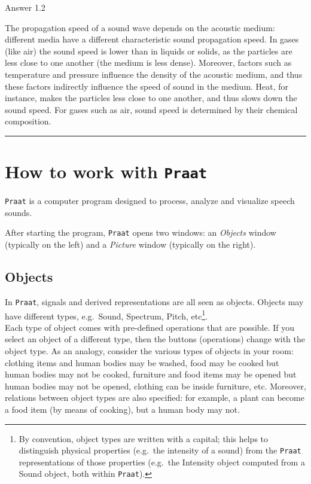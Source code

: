 \documentclass[
]{book}
\begin{document}
Answer 1.2

The propagation speed of a sound wave depends on the acoustic medium: different media have a different characteristic sound propagation speed. In gases (like air) the sound speed is lower than in liquids or solids, as the particles are less close to one another (the medium is less dense). Moreover, factors such as temperature and pressure influence the density of the acoustic medium, and thus these factors indirectly influence the speed of sound in the medium. Heat, for instance, makes the particles less close to one another, and thus slows down the sound speed. For gases such as air, sound speed is determined by their chemical composition.

\begin{center}\rule{0.5\linewidth}{0.5pt}\end{center}

\label{box-praatintro}
\section{\texorpdfstring{How to work with \texttt{Praat}}{How to work with Praat}}\label{sec-praatintro}

\texttt{Praat} is a computer program designed to process, analyze and visualize speech sounds.

After starting the program, \texttt{Praat} opens two windows: an \emph{Objects} window (typically on the left) and a \emph{Picture} window (typically on the right).

\subsection*{Objects}\label{objects}

In \texttt{Praat}, signals and derived representations are all seen as objects. Objects may have different types, e.g.~Sound, Spectrum, Pitch, etc\footnote{By convention, object types are written with a capital; this helps to distinguish physical properties (e.g.~the intensity of a sound) from the \texttt{Praat} representations of those properties (e.g.~the Intensity object computed from a Sound object, both within \texttt{Praat}).}.\\
Each type of object comes with pre-defined operations that are possible. If you select an object of a different type, then the buttons (operations) change with the object type.
As an analogy, consider the various types of objects in your room: clothing items and human bodies may be washed, food may be cooked but human bodies may not be cooked, furniture and food items may be opened but human bodies may not be opened, clothing can be inside furniture, etc. Moreover, relations between object types are also specified: for example, a plant can become a food item (by means of cooking), but a human body may not.
\end{document}
